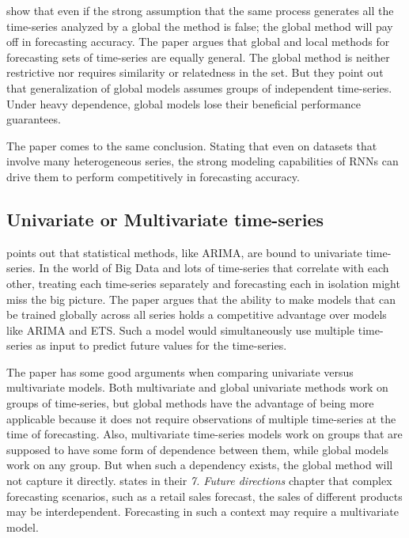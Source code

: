 


\cite{Montero-Manso2021} show that even if the strong assumption that the same process generates all the time-series analyzed by a global
the method is false; the global method will pay off in forecasting accuracy.
The paper argues that global and local methods for forecasting
sets of time-series are equally general. The global method is neither restrictive nor requires
similarity or relatedness in the set.
But they point out that generalization of global models assumes groups of independent time-series.
Under heavy dependence, global models lose their beneficial performance guarantees.

The paper \cite{Hewamalage2021} comes to the same conclusion. Stating that
even on datasets that involve many heterogeneous series, the strong modeling capabilities of RNNs can drive
them to perform competitively in forecasting accuracy.

\subsection{Univariate or Multivariate time-series}
\cite{Bandara2017} points out that statistical methods, like ARIMA, are bound to
univariate time-series. In the world of Big Data and lots of time-series that correlate with each other,
treating each time-series separately and forecasting each in isolation might miss the big picture.
The paper argues that the ability to make models that can be trained globally across all series
holds a competitive advantage over models like ARIMA and ETS.
Such a model would simultaneously use multiple time-series as input to predict future values for the time-series.

The paper \cite{Rabanser2020} has some good arguments when comparing univariate versus multivariate models.
Both multivariate and global univariate methods work on groups of time-series, but global methods
have the advantage of being more applicable because it does not require observations of multiple
time-series at the time of forecasting.
Also, multivariate time-series models work on groups that are supposed to have some form of
dependence between them, while global models work on any group.
But when such a dependency exists, the global method will not capture it directly.
\cite{Hewamalage2021} states in their \textit{7. Future directions} chapter that complex
forecasting scenarios, such as a retail sales forecast, the sales of different products
may be interdependent.
Forecasting in such a context may require a multivariate model.

